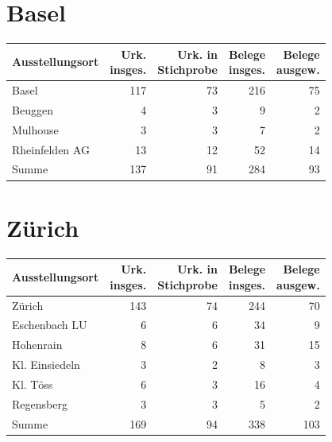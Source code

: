 \section{Basel}

\begin{tabularx}{\linewidth}{X r r r r}
\toprule
Ausstellungsort
	& \makecell{Urk.\\ insges.}
	& \makecell{Urk. in\\ Stichprobe}
	& \makecell{Belege\\ insges.}
	& \makecell{Belege\\ ausgew.}
	\\
\midrule

Basel
	& 117
	& 73
	& 216
	& 75
	\\

Beuggen
	& 4
	& 3
	& 9
	& 2
	\\

Mulhouse
	& 3
	& 3
	& 7
	& 2
	\\

Rheinfelden AG
	& 13
	& 12
	& 52
	& 14
	\\

\midrule

Summe
	& 137
	& 91
	& 284
	& 93
	\\

\bottomrule
\end{tabularx}

\section{Zürich}

\begin{tabularx}{\linewidth}{X r r r r}
\toprule
Ausstellungsort
	& \makecell{Urk.\\ insges.}
	& \makecell{Urk. in\\ Stichprobe}
	& \makecell{Belege\\ insges.}
	& \makecell{Belege\\ ausgew.}
	\\
\midrule

Zürich
	& 143
	& 74
	& 244
	& 70
	\\

Eschenbach LU
	& 6
	& 6
	& 34
	& 9
	\\

Hohenrain
	& 8
	& 6
	& 31
	& 15
	\\

Kl. Einsiedeln
	& 3
	& 2
	& 8
	& 3
	\\

Kl. Töss
	& 6
	& 3
	& 16
	& 4
	\\

Regensberg
	& 3
	& 3
	& 5
	& 2
	\\

\midrule

Summe
	& 169
	& 94
	& 338
	& 103
	\\

\bottomrule
\end{tabularx}

